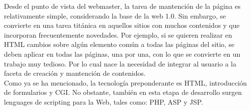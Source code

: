 Desde el punto de vista del webmaster, la tarea de mantención de la página es relativamente simple, 
considerando la base de la web 1.0. Sin embargo, se convierte en una tarea titánica en aquellos sitios con 
muchos contenidos y que incorporan frecuentemente novedades. Por ejemplo, si se quieren realizar en HTML 
cambios sobre algún elemento común a todas las páginas del sitio, se deben aplicar en todas las páginas,
una por una, con lo que se  convierte en un trabajo muy tedioso. Por lo cual nace la necesidad de 
integrar al usuario a la faceta de creación y mantención de contenidos.\\

Como ya se ha mencionado, la tecnología preponderante es HTML, introducción de formularios y CGI. 
No obstante, también en esta etapa de desarrollo surgen lenguages de scripting para la Web, tales 
como: PHP, ASP y JSP.\\

